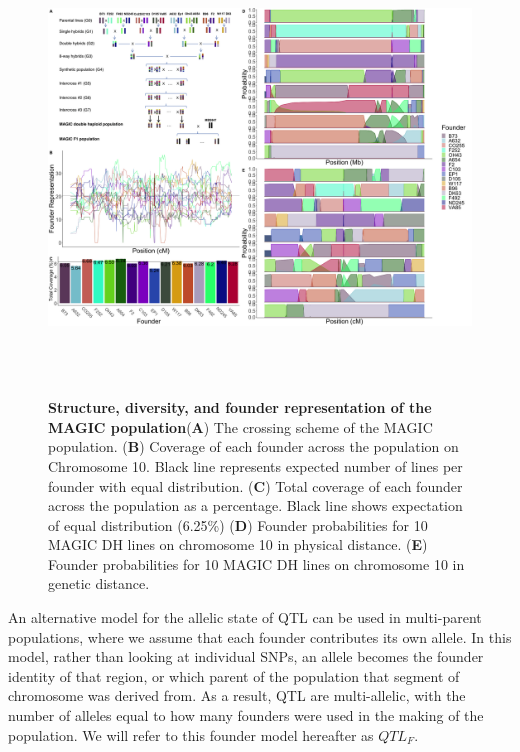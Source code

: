 \documentclass[article,9pt,twocolumn,twoside]{rilabRxiv}
\newcommand{\der}{{\textcolor{purple}{X}}}
\begin{document}
\begin{figure}[ht!]
\centering
\includegraphics[width=\textwidth,height=12cm]{figures/Methods_Fig1.png}
\caption{\textbf{Structure, diversity, and founder representation of the MAGIC population}(\textbf{A}) The crossing scheme of the MAGIC population. (\textbf{B}) Coverage of each founder across the population on Chromosome 10. Black line represents expected number of lines per founder with equal distribution. (\textbf{C}) Total coverage of each founder across the population as a percentage. Black line shows expectation of equal distribution (6.25\%)  (\textbf{D}) Founder probabilities for 10 MAGIC DH lines on chromosome 10 in physical distance. (\textbf{E}) Founder probabilities for 10 MAGIC DH lines on chromosome 10 in genetic distance.}
\label{fig:figure1}
\end{figure}

An alternative model for the allelic state of QTL can be used in multi-parent populations, where we assume that each founder contributes its own allele.
In this model, rather than looking at individual SNPs, an allele becomes the founder identity of that region, or which parent of the population that segment of chromosome was derived from.
As a result, QTL are multi-allelic, with the number of alleles equal to how many founders were used in the making of the population.
We will refer to this founder model hereafter as $QTL_F$.
\end{document}
